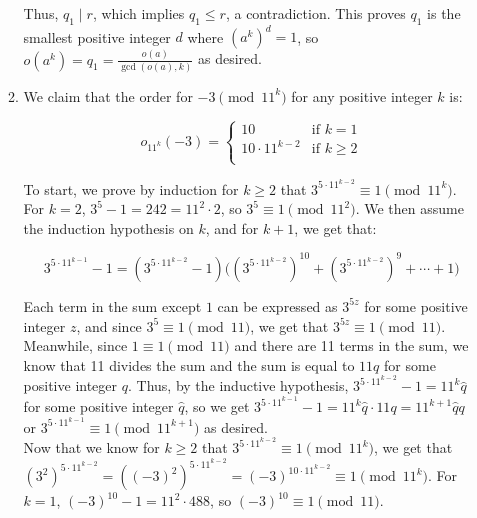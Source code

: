\documentclass{article}
\begin{document}
\begin{enumerate}[leftmargin=*, label=\arabic*.]
\begin{enumerate}[label=\alph*)]
    Thus, $q_1 \mid r$, which implies $q_1 \leq r$, a contradiction. This proves $q_1$ is the smallest positive integer $d$ where $(a^k)^d = 1$, so $o(a^k) = q_1 = \frac{o(a)}{\gcd(o(a), k)}$ as desired. \\

     \item 
     We claim that the order for $-3 \pmod{11^k}$ for any positive integer $k$ is: 

    \[
    o_{11^k}(-3)=
    \begin{cases}
      10 & \text{if } k = 1 \\
      10 \cdot 11^{k-2} & \text{if } k \geq 2 \\
    \end{cases}
    \]
    
    To start, we prove by induction for $k \geq 2$ that $3^{5 \cdot 11^{k-2}} \equiv 1 \pmod{11^k}$. For $k = 2$, $3^5 - 1 = 242 = 11^2 \cdot 2$, so $3^5 \equiv 1 \pmod{11^2}$. We then assume the induction hypothesis on $k$, and for $k + 1$, we get that:
        
    $$3^{5 \cdot 11^{k-1}} - 1 = (3^{5 \cdot 11^{k-2}} - 1)\big((3^{5 \cdot 11^{k-2}})^{10} + (3^{5 \cdot 11^{k-2}})^{9} + \cdots + 1 \big)$$
        
    Each term in the sum except $1$ can be expressed as $3^{5z}$ for some positive integer $z$, and since $3^{5} \equiv 1 \pmod{11}$, we get that $3^{5z} \equiv 1 \pmod{11}$. Meanwhile, since $1 \equiv 1 \pmod{11}$ and there are 11 terms in the sum, we know that 11 divides the sum and the sum is equal to $11q$ for some positive integer $q$. Thus, by the inductive hypothesis, $3^{5 \cdot 11^{k-2}} - 1 = 11^k \hat{q}$ for some positive integer $\hat{q}$, so we get $3^{5 \cdot 11^{k-1}} - 1 = 11^k \hat{q} \cdot 11q = 11^{k+1}\hat{q}q$ or $3^{5 \cdot 11^{k-1}} \equiv 1 \pmod{11^{k+1}}$ as desired. \\
    
    Now that we know for $k \geq 2$ that $3^{5 \cdot 11^{k-2}} \equiv 1 \pmod{11^k}$, we get that $(3^2)^{5 \cdot 11^{k-2}} = ((-3)^2)^{5 \cdot 11^{k-2}} = (-3)^{10\cdot 11^{k-2}} \equiv 1 \pmod{11^k}$. For $k = 1$, $(-3)^{10} - 1 = 11^2 \cdot 488$, so $(-3)^{10} \equiv 1 \pmod{11}$.\\
        

\end{enumerate}
\end{enumerate}
\end{document}
